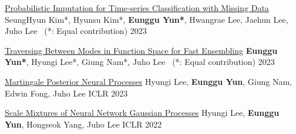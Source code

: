 \documentclass[11pt, a4paper]{cv}
\begin{document}

\begin{cvsubentries}

  \cvpublication
    {\href{https://openreview.net/forum?id=fBoNN1Y6PjG}{Probabilistic Imputation for Time-series Classification with Missing Data}} %
    {SeungHyun Kim*, Hyunsu Kim*, \textbf{Eunggu Yun*}, Hwangrae Lee, Jaehun Lee, Juho Lee \, (*: Equal contribution)} %
    {} %
    {2023} %
    {}

  \cvpublication
    {\href{https://openreview.net/forum?id=cS45VNtZLW}{Traversing Between Modes in Function Space for Fast Ensembling}} %
    {\textbf{Eunggu Yun*}, Hyungi Lee*, Giung Nam*, Juho Lee \, (*: Equal contribution)} %
    {} %
    {2023} %
    {}

\end{cvsubentries}


\begin{cvsubentries}

  \cvpublication
    {\href{https://openreview.net/forum?id=-9PVqZ-IR_}{Martingale Posterior Neural Processes}} %
    {Hyungi Lee, \textbf{Eunggu Yun}, Giung Nam, Edwin Fong, Juho Lee} %
    {ICLR \small{}} %
    {2023} %
    {}

  \cvpublication
    {\href{https://openreview.net/forum?id=YVPBh4k78iZ}{Scale Mixtures of Neural Network Gaussian Processes}} %
    {Hyungi Lee, \textbf{Eunggu Yun}, Hongseok Yang, Juho Lee} %
    {ICLR} %
    {2022} %
    {}

\end{cvsubentries}


\end{document}
